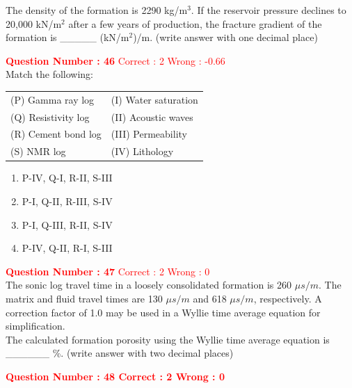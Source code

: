 \documentclass[12pt]{article}
\begin{document}
{The density of the formation is 2290 kg/m$^3$. If the reservoir pressure declines to 20,000 kN/m$^2$ after a few years of production, the fracture gradient of the formation is \_\_\_\_\_ (kN/m$^2$)/m. (write answer with one decimal place)

\vspace{2ex}

\textbf{\textcolor{red}{Question Number : 46}} \hfill \textcolor{red}{Correct : 2  Wrong : -0.66} \\[1ex]
Match the following:

\begin{tabular}{ll}
(P) Gamma ray log & (I) Water saturation \\
(Q) Resistivity log & (II) Acoustic waves \\
(R) Cement bond log & (III) Permeability \\
(S) NMR log & (IV) Lithology \\
\end{tabular}

\begin{enumerate}[label=(\Alph*)]
    \item P-IV, Q-I, R-II, S-III \\
    \item P-I, Q-II, R-III, S-IV \\
    \item P-I, Q-III, R-II, S-IV \\
    \item P-IV, Q-II, R-I, S-III
\end{enumerate}

\vspace{2ex}

\textbf{\textcolor{red}{Question Number : 47}} \hfill \textcolor{red}{Correct : 2  Wrong : 0} \\[1ex]
The sonic log travel time in a loosely consolidated formation is 260 $\mu s/m$. The matrix and fluid travel times are 130 $\mu s/m$ and 618 $\mu s/m$, respectively. A correction factor of 1.0 may be used in a Wyllie time average equation for simplification.\\[1ex]

The calculated formation porosity using the Wyllie time average equation is \_\_\_\_\_\_ \%. (write answer with two decimal places)

\textcolor{red}{\textbf{Question Number : 48 \hfill Correct : 2  Wrong : 0}}

\vspace{0.5em}

}
\end{document}
